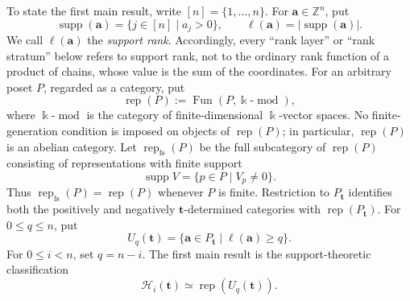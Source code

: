 \documentclass[12pt,reqno]{amsart}
\theoremstyle{definition}
\theoremstyle{remark}
\newcommand{\Rep}{\operatorname{rep}}
\newcommand{\modcat}{\operatorname{mod}}
\begin{document}
To state the first main result, write $[n]=\{1,\ldots,n\}$.  For
$\mathbf a\in\mathbb Z^n$, put
\[
\operatorname{supp}(\mathbf a)=\{j\in[n]\mid a_j>0\},
\qquad
\ell(\mathbf a)=|\operatorname{supp}(\mathbf a)|.
\]
We call $\ell(\mathbf a)$ the \emph{support rank}.  Accordingly, every
``rank layer'' or ``rank stratum'' below refers to support rank, not to the
ordinary rank function of a product of chains, whose value is the sum of the
coordinates.  For an arbitrary poset $P$, regarded as a category, put
\[
\Rep(P):=\operatorname{Fun}(P,\Bbbk\text{-}\modcat),
\]
where $\Bbbk\text{-}\modcat$ is the category of finite-dimensional
$\Bbbk$-vector spaces.  No finite-generation condition is imposed on objects
of $\Rep(P)$; in particular,   $\Rep(P)$ is an abelian category.  Let $\Rep_{\mathrm{fs}}(P)$ be the full subcategory of $\Rep(P)$ consisting of
representations with finite support
\[
\operatorname{supp}V=\{p\in P\mid V_p\ne0\}.
\]
Thus $\Rep_{\mathrm{fs}}(P)=\Rep(P)$ whenever $P$ is finite.  Restriction to
$P_{\mathbf t}$ identifies both the positively and negatively
$\mathbf t$-determined categories with $\Rep(P_{\mathbf t})$.
For $0\le q\le n$, put
\[
U_q(\mathbf t)
=
\{\mathbf a\in P_{\mathbf t}\mid \ell(\mathbf a)\ge q\}.
\]
For $0\le i<n$, set $q=n-i$.  The first main result is the support-theoretic
classification
\begin{equation}\label{eq:intro-classification}
\boxed{
\mathcal H_i(\mathbf t)\simeq\Rep(U_q(\mathbf t)).}
\end{equation}
\end{document}
